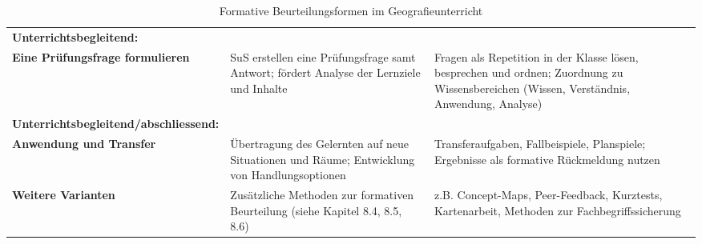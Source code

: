 \begin{table}[H]
\begin{tabular}{>{\bfseries}p{3.5cm} | p{4.5cm} | p{7cm}}
    \midrule
    Unterrichtsbegleitend:                                                                                                                                                    \\
    Eine Prüfungsfrage formulieren                                                                                   &
    SuS erstellen eine Prüfungsfrage samt Antwort; fördert Analyse der Lernziele und Inhalte                         &
    Fragen als Repetition in der Klasse lösen, besprechen und ordnen; Zuordnung zu Wissensbereichen (Wissen, Verständnis, Anwendung, Analyse)                                 \\
    \midrule
    Unterrichtsbegleitend/abschliessend:                                                                                                                                      \\
    Anwendung und Transfer                                                                                           &
    Übertragung des Gelernten auf neue Situationen und Räume; Entwicklung von Handlungsoptionen                      &
    Transferaufgaben, Fallbeispiele, Planspiele; Ergebnisse als formative Rückmeldung nutzen                                                                                  \\
    \midrule
    Weitere Varianten                                                                                                &
    Zusätzliche Methoden zur formativen Beurteilung (siehe Kapitel 8.4, 8.5, 8.6)                                    &
    z.B. Concept-Maps, Peer-Feedback, Kurztests, Kartenarbeit, Methoden zur Fachbegriffssicherung                                                                             \\
    \bottomrule
  \end{tabular}
  \caption{Formative Beurteilungsformen im Geografieunterricht}
\end{table}

